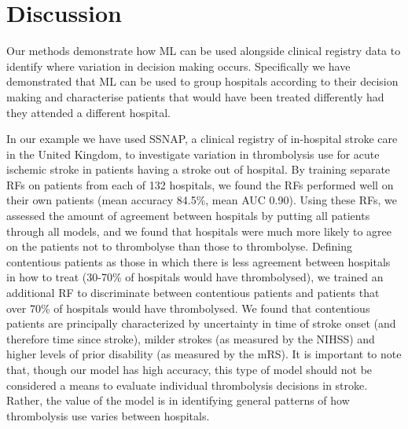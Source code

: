 \documentclass[12pt,a4paper, pdftex]{elsarticle}
\begin{document}
\section{Discussion}

Our methods demonstrate how ML can be used alongside clinical registry data to identify where variation in decision making occurs. Specifically we have demonstrated that ML can be used to group hospitals according to their decision making and characterise patients that would have been treated differently had they attended a different hospital. 

In our example we have used SSNAP, a clinical registry of in-hospital stroke care in the United Kingdom, to investigate variation in thrombolysis use for acute ischemic stroke in patients having a stroke out of hospital. By training separate RFs on patients from each of 132 hospitals, we found the RFs performed well on their own patients (mean accuracy 84.5\%, mean AUC 0.90). Using these RFs, we assessed the amount of agreement between hospitals by putting all patients through all models, and we found that hospitals were much more likely to agree on the patients not to thrombolyse than those to thrombolyse. Defining contentious patients as those in which there is less agreement between hospitals in how to treat (30-70\% of hospitals would have thrombolysed), we trained an additional RF to discriminate between contentious patients and patients that over 70\% of hospitals would have thrombolysed. We found that contentious patients are principally characterized by uncertainty in time of stroke onset (and therefore time since stroke), milder strokes (as measured by the NIHSS) and higher levels of prior disability (as measured by the mRS). It is important to note that, though our model has high accuracy, this type of model should not be considered a means to evaluate individual thrombolysis decisions in stroke. Rather, the value of the model is in identifying general patterns of how thrombolysis use varies between hospitals.
\end{document}
